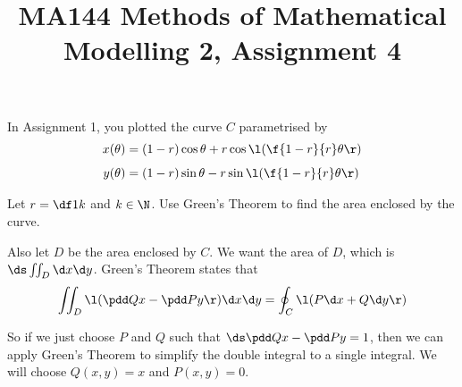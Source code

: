 \documentclass[a4paper]{article}
\title{MA144 Methods of Mathematical Modelling 2, Assignment 4}
\begin{document}
\maketitle

\setlength{\parindent}{0em}
\setlength{\parskip}{1em}


\begin{questionbody}
In Assignment 1, you plotted the curve $C$ parametrised by \begin{align*}
x(\theta) &= (1-r) \cos \theta + r \cos \l( \f{1-r}{r} \theta \r) \\[1ex]
y(\theta) &= (1-r) \sin \theta - r \sin \l( \f{1-r}{r} \theta \r)
\end{align*}

Let $r = \df1k$ and $k \in \N$. Use Green's Theorem to find the area enclosed by the curve.
\end{questionbody}

Also let $D$ be the area enclosed by $C$. We want the area of $D$, which is $\ds \iint_D \d x \d y$. Green's Theorem states that $$\iint_D \l( \pdd Qx - \pdd Py \r) \d x \d y = \oint_C \l( P \d x + Q \d y \r)$$

So if we just choose $P$ and $Q$ such that $\ds \pdd Qx - \pdd Py = 1$, then we can apply Green's Theorem to simplify the double integral to a single integral. We will choose $Q(x, y) = x$ and $P(x, y) = 0$.
\end{document}
